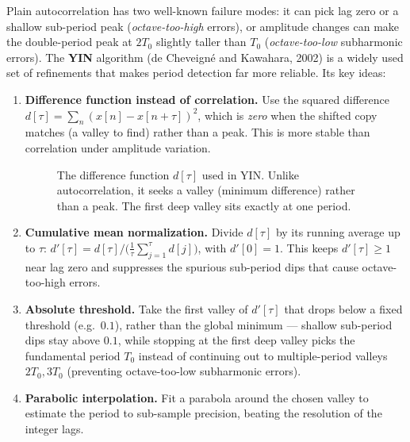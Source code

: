 Plain autocorrelation has two well-known failure modes: it can pick lag zero or a
shallow sub-period peak (\emph{octave-too-high} errors), or amplitude changes can make the double-period peak at $2T_0$ slightly taller than $T_0$ (\emph{octave-too-low} subharmonic errors). The
\textbf{YIN} algorithm (de Cheveign\'e and Kawahara, 2002) is a widely used set of
refinements that makes period detection far more reliable. Its key ideas:

\begin{enumerate}
  \item \textbf{Difference function instead of correlation.} Use the squared
        difference $d[\tau] = \sum_n (x[n] - x[n+\tau])^2$, which is \emph{zero}
        when the shifted copy matches (a valley to find) rather than a peak. This
        is more stable than correlation under amplitude variation.

\begin{figure}[H]
\centering
{}
\caption{The difference function $d[\tau]$ used in YIN. Unlike autocorrelation, it seeks a valley (minimum difference) rather than a peak. The first deep valley sits exactly at one period.}
\label{ch27:fig-difference-function}
\end{figure}
  \item \textbf{Cumulative mean normalization.} Divide $d[\tau]$ by its running
        average up to $\tau$: $d'[\tau] = d[\tau]\big/\bigl(\frac{1}{\tau}\sum_{j=1}^{\tau} d[j]\bigr)$, with $d'[0]=1$. This keeps $d'[\tau] \ge 1$ near lag zero
        and suppresses the spurious sub-period dips that cause octave-too-high errors.
  \item \textbf{Absolute threshold.} Take the first valley of $d'[\tau]$ that drops below a fixed
        threshold (e.g.\ $0.1$), rather than the global minimum --- shallow sub-period dips stay above $0.1$, while stopping at the first deep valley picks the fundamental period $T_0$ instead of continuing out to multiple-period valleys $2T_0, 3T_0$ (preventing octave-too-low subharmonic errors).
  \item \textbf{Parabolic interpolation.} Fit a parabola around the chosen valley
        to estimate the period to sub-sample precision, beating the resolution of
        the integer lags.
\end{enumerate}

